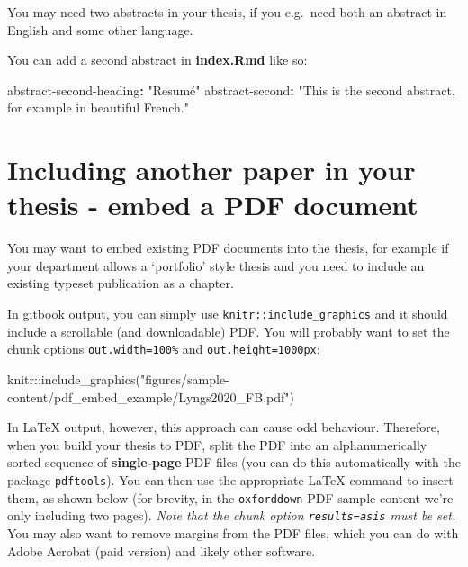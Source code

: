 \documentclass[a4paper, nobind]{templates/ociamthesis}
\newenvironment{Shaded}{\begin{snugshade}}{\end{snugshade}}
\newcommand{\AttributeTok}[1]{\textcolor[rgb]{0.77,0.63,0.00}{#1}}
\newcommand{\FunctionTok}[1]{\textcolor[rgb]{0.00,0.00,0.00}{#1}}
\newcommand{\KeywordTok}[1]{\textcolor[rgb]{0.13,0.29,0.53}{\textbf{#1}}}
\newcommand{\NormalTok}[1]{#1}
\newcommand{\SpecialCharTok}[1]{\textcolor[rgb]{0.00,0.00,0.00}{#1}}
\newcommand{\StringTok}[1]{\textcolor[rgb]{0.31,0.60,0.02}{#1}}
\renewenvironment{Shaded}
{
  \vspace{10pt}%
  \begin{snugshade}%
}{%
  \end{snugshade}%
  \vspace{8pt}%
}
\begin{document}
You may need two abstracts in your thesis, if you e.g.~need both an abstract in English and some other language.

You can add a second abstract in \textbf{index.Rmd} like so:

\begin{Shaded}
\begin{Highlighting}[]
\FunctionTok{abstract{-}second{-}heading}\KeywordTok{:}\AttributeTok{ }\StringTok{"Resumé"}
\FunctionTok{abstract{-}second}\KeywordTok{:}\AttributeTok{ }\StringTok{"This is the second abstract, for example in beautiful French."}\AttributeTok{ }
\end{Highlighting}
\end{Shaded}

\hypertarget{embed-pdf}{%
\section{Including another paper in your thesis - embed a PDF document}\label{embed-pdf}}

You may want to embed existing PDF documents into the thesis, for example if your department allows a `portfolio' style thesis and you need to include an existing typeset publication as a chapter.

In gitbook output, you can simply use \texttt{knitr::include\_graphics} and it should include a scrollable (and downloadable) PDF.
You will probably want to set the chunk options \texttt{out.width=\textquotesingle{}100\%\textquotesingle{}} and \texttt{out.height=\textquotesingle{}1000px\textquotesingle{}}:

\begin{Shaded}
\begin{Highlighting}[]
\NormalTok{knitr}\SpecialCharTok{::}\FunctionTok{include\_graphics}\NormalTok{(}\StringTok{"figures/sample{-}content/pdf\_embed\_example/Lyngs2020\_FB.pdf"}\NormalTok{)}
\end{Highlighting}
\end{Shaded}

In LaTeX output, however, this approach can cause odd behaviour.
Therefore, when you build your thesis to PDF, split the PDF into an alphanumerically sorted sequence of \textbf{single-page} PDF files (you can do this automatically with the package \texttt{pdftools}). You can then use the appropriate LaTeX command to insert them, as shown below (for brevity, in the \texttt{oxforddown} PDF sample content we're only including two pages).
\emph{Note that the chunk option \texttt{results=\textquotesingle{}asis\textquotesingle{}} must be set.}
You may also want to remove margins from the PDF files, which you can do with Adobe Acrobat (paid version) and likely other software.
\end{document}
